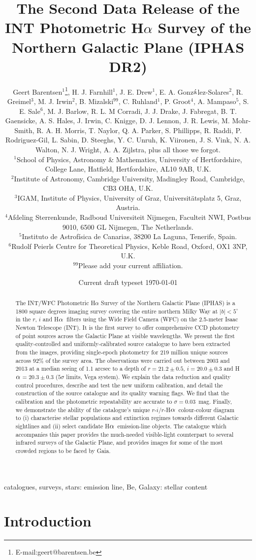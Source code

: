 \documentclass[useAMS,usenatbib]{mn2e}
\title[IPHAS Data Release 2]{The Second Data Release 
of the INT Photometric H$\alpha$ Survey 
of the Northern Galactic Plane (IPHAS DR2)}
\author[G. Barentsen
et. al]{Geert Barentsen$^{1}$\thanks{E-mail:geert@barentsen.be},
H. J. Farnhill$^1$,
J. E. Drew$^1$,
E. A. Gonz$\acute{\rm{a}}$lez-Solares$^2$, \newauthor
R. Greimel$^3$,
M. J. Irwin$^2$,
B. Mizalski$^{99}$,
C. Ruhland$^1$,
P. Groot$^4$,
A. Mampaso$^5$, \newauthor
S. E. Sale$^6$,
M. J. Barlow,
R. L. M Corradi,
J. J. Drake,
J. Fabregat,
B. T. Gaensicke,
A. S. Hales,
J. Irwin,
C. Knigge,
D. J. Lennon,
J. R. Lewis,
M. Mohr-Smith,
R. A. H. Morris,
T. Naylor,
Q. A. Parker,
S. Phillipps,
R. Raddi,
P. Rodriguez-Gil,
L. Sabin,
D. Steeghs,
Y. C. Unruh,
K. Viironen,
J. S. Vink,
N. A. Walton,
N. J. Wright,
A. A. Zijlstra,
plus all those we forgot.
\newauthor\\
$^{1}$School of Physics, Astronomy \& Mathematics, University of Hertfordshire, College Lane, Hatfield, Hertfordshire, AL10 9AB, U.K.\\
$^{2}$Institute of Astronomy, Cambridge University, Madingley Road, Cambridge, CB3 OHA, U.K.\\
$^{3}$IGAM, Institute of Physics, University of Graz, Universit\"atsplatz 5, Graz, Austria.\\
$^{4}$Afdeling Sterrenkunde, Radboud Universiteit Nijmegen, Faculteit NWI, Postbus 9010, 6500 GL Nijmegen, The Netherlands.\\
$^{5}$Instituto de Astrof\'isica de Canarias, 38200 La Laguna, Tenerife, Spain.\\
$^{6}$Rudolf Peierls Centre for Theoretical Physics, Keble Road, Oxford, OX1 3NP, U.K.\\
$^{99}$Please add your current affiliation.\\
}
\def\ha{\mbox{H$\rm \alpha$}}
\begin{document}
\date{Current draft typeset \today}
\pagerange{\pageref{firstpage}--\pageref{lastpage}} 

\maketitle

\label{firstpage}

\begin{abstract} %
The INT/WFC Photometric H$\alpha$ Survey 
of the Northern Galactic Plane (IPHAS)
is a 1800 square degrees imaging survey
covering the entire northern Milky Way at $|b| < 5^\circ$
in the $r$, $i$ and \ha\ filters 
using the Wide Field Camera (WFC) 
on the 2.5-meter Isaac Newton Telescope (INT).
It is the first survey to offer comprehensive CCD photometry
of point sources across the Galactic Plane at visible wavelengths.
We present the first quality-controlled and
uniformly-calibrated source catalogue
to have been extracted from the images,
providing single-epoch photometry
for 219 million unique sources
across 92\% of the survey area.
The observations were carried out between 2003 and 2013
at a median seeing of 1.1 arcsec
to a depth of $r=21.2\pm 0.5$, $i=20.0\pm 0.3$ and \ha$=20.3\pm 0.3$
($5\sigma$ limits, Vega system).
We explain the data reduction 
and quality control procedures,
describe and test the new uniform calibration,
and detail the construction of the source catalogue
and its quality warning flags.
We find that the calibration
and the photometric repeatability are accurate to
$\sigma=0.03$~mag.
Finally, we demonstrate the ability of the 
catalogue's unique
$r$-$i$/$r$-\ha\ colour-colour diagram to
(i) characterise stellar populations and extinction regimes
towards different Galactic sightlines
and (ii) select candidate \ha\ emission-line objects.
The catalogue which accompanies this paper
provides the much-needed visible-light counterpart
to several infrared surveys of the Galactic Plane,
and provides images for some of the most
crowded regions to be faced by Gaia.
\end{abstract}

\begin{keywords}
catalogues, surveys, stars: emission line, Be, Galaxy: stellar content
\end{keywords}

\section{Introduction}
\end{document}
